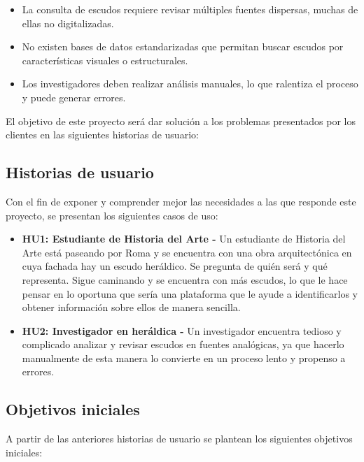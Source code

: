 \begin{itemize}
    \item La consulta de escudos requiere revisar múltiples fuentes dispersas, 
    muchas de ellas no digitalizadas.
    \item No existen bases de datos estandarizadas que permitan buscar escudos por
    características visuales o estructurales.
    \item Los investigadores deben realizar análisis manuales, lo que ralentiza el
    proceso y puede generar errores.
\end{itemize}

El objetivo de este proyecto será dar solución a los problemas presentados por los
clientes en las siguientes historias de usuario:

\subsection{Historias de usuario}
Con el fin de exponer y comprender mejor las necesidades a las que responde este
proyecto, se presentan los siguientes casos de uso:

\begin{itemize}
    \item \textbf{HU1: Estudiante de Historia del Arte - } Un estudiante de Historia del 
    Arte está paseando por Roma y se encuentra con una obra arquitectónica en cuya fachada
    hay un escudo heráldico. Se pregunta de quién será y qué representa. Sigue caminando 
    y se encuentra con más escudos, lo que le hace pensar en lo oportuna que sería una 
    plataforma que le ayude a identificarlos y obtener información sobre ellos de manera 
    sencilla.
    \item \textbf{HU2: Investigador en heráldica - } Un investigador encuentra tedioso y
    complicado analizar y revisar escudos en fuentes analógicas, ya que hacerlo manualmente
    de esta manera lo convierte en un proceso lento y propenso a errores.
\end{itemize}

\subsection{Objetivos iniciales}
A partir de las anteriores historias de usuario se plantean los siguientes objetivos
iniciales:

